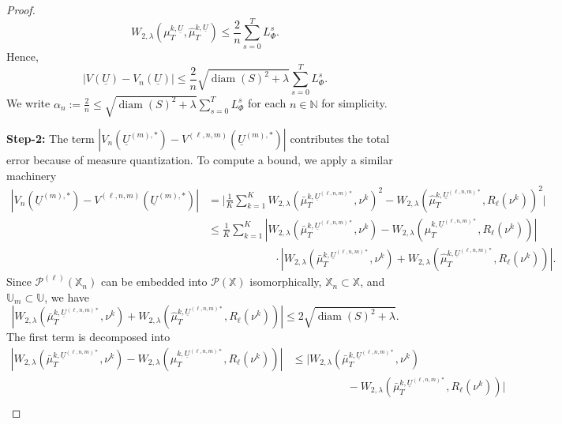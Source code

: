 \documentclass[11pt]{article}
\newcommand{\NN}{\mathbb{N}}
\newcommand{\XX}{\mathbb{X}}
\newcommand{\UU}{\mathbb{U}}
\newcommand{\cP}{\mathcal{P}}
\begin{document}
\begin{proof}
    \begin{equation*}
        W_{2,\lambda}(\mu_{T}^{k,\underline{U}}, \hat{\mu}_{T}^{k,\underline{U}}) \leq \frac{2}{n}\sum_{s=0}^TL_\Phi^s.
    \end{equation*}
    Hence, 
    \begin{equation*}
        |V(\underline{U}) - V_n(\underline{U})| \leq \frac{2}{n}\sqrt{\operatorname{diam}(S)^2 + \lambda}\sum_{s=0}^TL_\Phi^s.
    \end{equation*}
    We write $\alpha_n := \frac{2}{n}\leq \sqrt{\operatorname{diam}(S)^2 + \lambda}\sum_{s=0}^TL_\Phi^s$ for each $n\in\NN$ for simplicity.
    \medskip

    \noindent\textbf{Step-2:} The term $|V_n(\underline{U}^{(m),*}) - V^{(\ell,n,m)}(\underline{U}^{(m),*})|$ contributes the total error because of measure quantization. To compute a bound, we apply a similar machinery
\begin{align*}
    |V_n(\underline{U}^{(m),*}) - V^{(\ell,n,m)}(\underline{U}^{(m),*})| &= \bigg|\frac{1}{K}\sum_{k=1}^K W_{2,\lambda}(\bar{\mu}_{T}^{k,\underline{U}^{(\ell,n,m)*}}, \nu^k)^2 - W_{2,\lambda}(\hat{\mu}_{T}^{k,\underline{U}^{(\ell,n,m)*}}, R_\ell(\nu^k))^2\bigg|\\
    &\leq \frac{1}{K}\sum_{k=1}^K |W_{2,\lambda}(\bar{\mu}_{T}^{k,\underline{U}^{(\ell,n,m)*}}, \nu^k) - W_{2,\lambda}(\hat{\mu}_{T}^{k,\underline{U}^{(\ell,n,m)*}}, R_\ell(\nu^k))|\\
    &\qquad\qquad\qquad\cdot|W_{2,\lambda}(\bar{\mu}_{T}^{k,\underline{U}^{(\ell,n,m)*}}, \nu^k) + W_{2,\lambda}(\hat{\mu}_{T}^{k,\underline{U}^{(\ell,n,m)*}}, R_\ell(\nu^k))|.
\end{align*}
Since $\cP^{(\ell)}(\XX_n)$ can be embedded into $\cP(\XX)$ isomorphically, $\XX_n\subset\XX$, and $\UU_m\subset\UU$, we have 
\begin{equation*}
    |W_{2,\lambda}(\bar{\mu}_{T}^{k,\underline{U}^{(\ell,n,m)*}}, \nu^k) + W_{2,\lambda}(\hat{\mu}_{T}^{k,\underline{U}^{(\ell,n,m)*}}, R_\ell(\nu^k))| \leq 2\sqrt{\operatorname{diam}(S)^2 + \lambda}.
\end{equation*}
The first term is decomposed into
\begin{align*}
    |W_{2,\lambda}(\bar{\mu}_{T}^{k,\underline{U}^{(\ell,n,m)*}}, \nu^k) - W_{2,\lambda}(\hat{\mu}_{T}^{k,\underline{U}^{(\ell,n,m)*}}, R_\ell(\nu^k))| &\leq |W_{2,\lambda}(\bar{\mu}_{T}^{k,\underline{U}^{(\ell,n,m)*}}, \nu^k) \\
    &\hspace{5em}- W_{2,\lambda}(\bar{\mu}_{T}^{k,\underline{U}^{(\ell,n,m)*}}, R_\ell(\nu^k))|\\

\end{align*}
\end{proof}
\end{document}
